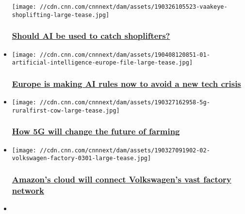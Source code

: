 \begin{itemize}
  \texttt{[image: //cdn.cnn.com/cnnnext/dam/assets/190326105523-vaakeye-shoplifting-large-tease.jpg]}

  \hypertarget{should-ai-be-used-to-catch-shoplifters-}{%
  \subsubsection{\texorpdfstring{\href{/2019/04/18/business/ai-vaak-shoplifting/index.html}{Should
  AI be used to catch shoplifters?
  }}{Should AI be used to catch shoplifters? }}\label{should-ai-be-used-to-catch-shoplifters-}}
\item
  \href{/2019/04/08/tech/ai-guidelines-eu/index.html}{}

  \texttt{[image: //cdn.cnn.com/cnnnext/dam/assets/190408120851-01-artificial-intelligence-europe-file-large-tease.jpg]}

  \hypertarget{europe-is-making-ai-rules-now-to-avoid-a-new-tech-crisis}{%
  \subsubsection{\texorpdfstring{\href{/2019/04/08/tech/ai-guidelines-eu/index.html}{Europe
  is making AI rules now to avoid a new tech
  crisis}}{Europe is making AI rules now to avoid a new tech crisis}}\label{europe-is-making-ai-rules-now-to-avoid-a-new-tech-crisis}}
\item
  \href{/2019/04/01/business/5g-farming/index.html}{}

  \texttt{[image: //cdn.cnn.com/cnnnext/dam/assets/190327162958-5g-ruralfirst-cow-large-tease.jpg]}

  \hypertarget{how-5g-will-change-the-future-of-farming}{%
  \subsubsection{\texorpdfstring{\href{/2019/04/01/business/5g-farming/index.html}{How
  5G will change the future of
  farming}}{How 5G will change the future of farming}}\label{how-5g-will-change-the-future-of-farming}}
\item
  \href{/2019/03/27/tech/amazon-volkswagen-partnership/index.html}{}

  \texttt{[image: //cdn.cnn.com/cnnnext/dam/assets/190327091902-02-volkswagen-factory-0301-large-tease.jpg]}

  \hypertarget{amazons-cloud-will-connect-volkswagens-vast-factory-network}{%
  \subsubsection{\texorpdfstring{\href{/2019/03/27/tech/amazon-volkswagen-partnership/index.html}{Amazon's
  cloud will connect Volkswagen's vast factory
  network}}{Amazon's cloud will connect Volkswagen's vast factory network}}\label{amazons-cloud-will-connect-volkswagens-vast-factory-network}}
\item
  \href{/2019/03/21/cars/driverless-cars-insurance-liability-explained/index.html}{}


\end{itemize}
